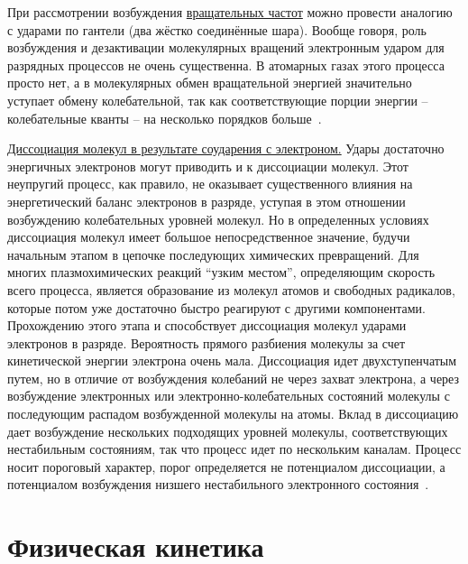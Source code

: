 \documentclass[10pt, a4paper]{article}
\numberwithin{equation}{section}
\begin{document}
При рассмотрении возбуждения \uline{вращательных частот} можно провести аналогию с ударами по гантели (два жёстко соединённые шара). Вообще говоря, роль возбуждения и дезактивации молекулярных вращений электронным ударом для разрядных процессов не очень существенна. В атомарных газах этого процесса просто нет, а в молекулярных обмен вращательной энергией значительно уступает обмену колебательной, так как соответствующие порции энергии -- колебательные кванты -- на несколько порядков больше~\cite{raizer}.

\uline{Диссоциация молекул в результате соударения с электроном.} Удары достаточно энергичных электронов могут приводить и к диссоциации молекул. Этот неупругий процесс, как правило, не оказывает существенного влияния на энергетический баланс электронов в разряде, уступая в этом отношении возбуждению колебательных уровней молекул. Но в определенных условиях диссоциация молекул имеет большое непосредственное значение, будучи начальным этапом в цепочке последующих химических превращений. Для многих плазмохимических реакций ``узким местом'', определяющим скорость всего процесса, является образование из молекул атомов и свободных радикалов, которые потом уже достаточно быстро реагируют с другими компонентами. Прохождению этого этапа и способствует диссоциация молекул ударами электронов в разряде. Вероятность прямого разбиения молекулы за счет кинетической энергии электрона очень мала. Диссоциация идет двухступенчатым путем, но в отличие от возбуждения колебаний не через захват электрона, а через возбуждение электронных или электронно-колебательных состояний молекулы с последующим распадом возбужденной молекулы на атомы. Вклад в диссоциацию дает возбуждение нескольких подходящих уровней молекулы, соответствующих нестабильным состояниям, так что процесс идет по нескольким каналам. Процесс носит пороговый характер, порог определяется не потенциалом диссоциации, а потенциалом возбуждения низшего нестабильного электронного состояния~\cite{raizer}.

\section{Физическая кинетика}
\end{document}
